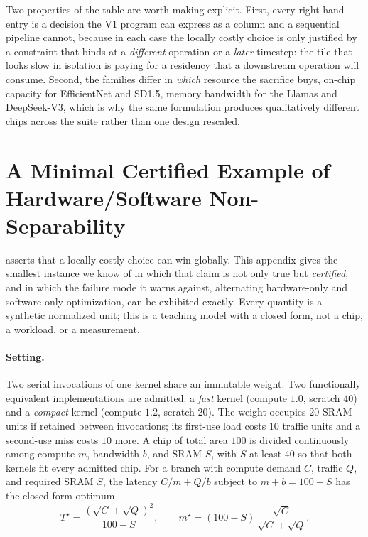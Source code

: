 Two properties of the table are worth making explicit. First, every right-hand
entry is a decision the V1 program can express as a column and a sequential
pipeline cannot, because in each case the locally costly choice is only
justified by a constraint that binds at a \emph{different} operation or a
\emph{later} timestep: the tile that looks slow in isolation is paying for a
residency that a downstream operation will consume. Second, the families differ
in \emph{which} resource the sacrifice buys, on-chip capacity for EfficientNet
and SD1.5, memory bandwidth for the Llamas and DeepSeek-V3, which is why the
same formulation produces qualitatively different chips across the suite rather
than one design rescaled.

\section{A Minimal Certified Example of Hardware/Software Non-Separability}
\label{app:synergy_example}

 asserts that a locally costly choice can win
globally. This appendix gives the smallest instance we know of in which that
claim is not only true but \emph{certified}, and in which the failure mode it
warns against, alternating hardware-only and software-only optimization, can be
exhibited exactly. Every quantity is a synthetic normalized unit; this is a
teaching model with a closed form, not a chip, a workload, or a measurement.

\paragraph{Setting.}
Two serial invocations of one kernel share an immutable weight. Two functionally
equivalent implementations are admitted: a \emph{fast} kernel (compute $1.0$,
scratch $40$) and a \emph{compact} kernel (compute $1.2$, scratch $20$). The
weight occupies $20$ SRAM units if retained between invocations; its first-use
load costs $10$ traffic units and a second-use miss costs $10$ more. A chip of
total area $100$ is divided continuously among compute $m$, bandwidth $b$, and
SRAM $S$, with $S$ at least $40$ so that both kernels fit every admitted chip.
For a branch with compute demand $C$, traffic $Q$, and required SRAM $S$, the
latency $C/m + Q/b$ subject to $m+b=100-S$ has the closed-form optimum
%
\begin{equation}
\label{eq:synergy_closed_form}
T^\star=\frac{(\sqrt{C}+\sqrt{Q})^{2}}{100-S},\qquad
m^\star=(100-S)\,\frac{\sqrt{C}}{\sqrt{C}+\sqrt{Q}} .
\end{equation}

